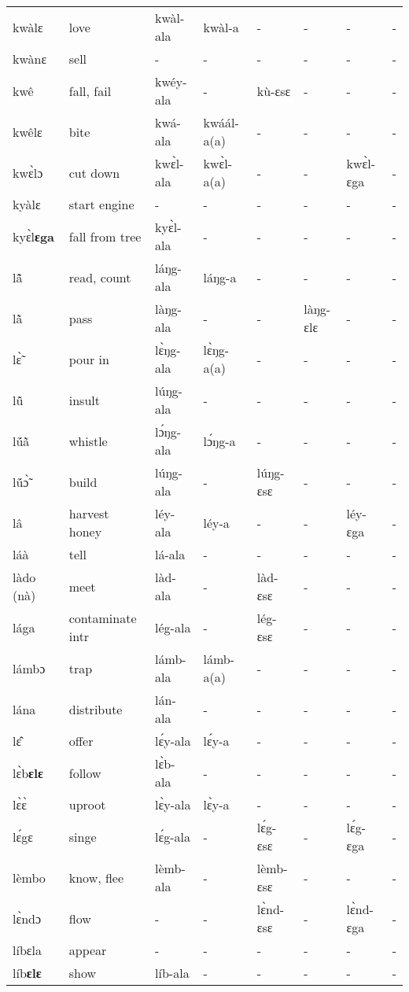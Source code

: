 \begin{sidewaystable}
\begin{longtable}{lp{3.5cm}llllll}
kwàlɛ & love & kwàl-ala & kwàl-a & - & - & - & - \\
kwànɛ & sell & - & - & - & - & - & - \\
kwê & fall, fail & kwéy-ala & - & kù-ɛsɛ & - & - & - \\
kwêlɛ & bite & kwá-ala & kwáál-a(a) & - & -  & - & - \\
 kwɛ̀lɔ & cut down & kwɛ̀l-ala & kwɛ̀l-a(a) & - & - & kwɛ̀l-ɛga & - \\
kyàlɛ & start engine & - & - & - & - & - & - \\
kyɛ̀l{\bfseries ɛga} & fall from tree & kyɛ̀l-ala & - & - & - & - & - \\
lã̂ & read, count & láŋg-ala & láŋg-a & - & - & - & - \\
lã̀ & pass & làŋg-ala & - & - &  làŋg-ɛlɛ  & - & - \\
lɛ̃̀ & pour in & lɛ̀ŋg-ala & lɛ̀ŋg-a(a)  & - & - & - & - \\
lũ̂ & insult & lúŋg-ala & - & - &  - & - & - \\
lṹã̀ & whistle & lɔ́ŋg-ala & lɔ́ŋg-a & - & - & - & - \\
lṹɔ̃̀ & build & lúŋg-ala & - & lúŋg-ɛsɛ & - & - & - \\
lâ & harvest honey & léy-ala & léy-a & - & - &  léy-ɛga & - \\
láà & tell & lá-ala & - & -  & - & - & - \\
làdo (nà) & meet & làd-ala & - & làd-ɛsɛ & - & - & - \\
lága & contaminate intr & lég-ala & - & lég-ɛsɛ & - & - & - \\
lámbɔ & trap & lámb-ala & lámb-a(a) & - & - & - & - \\
lána & distribute & lán-ala & - & - & - & - & - \\
lɛ̂ & offer & lɛ́y-ala & lɛ́y-a & - & - & - & - \\
lɛ̀b{\bfseries ɛlɛ} & follow & lɛ̀b-ala & - & - & - & - & - \\
lɛ̀ɛ̀ & uproot & lɛ̀y-ala & lɛ̀y-a & - & - & - & - \\
lɛ́gɛ & singe & lɛ́g-ala & - &  lɛ́g-ɛsɛ & - & lɛ́g-ɛga & - \\
lèmbo & know, flee & lèmb-ala & - & lèmb-ɛsɛ & - & - & - \\
lɛ̀ndɔ & flow & - & - & lɛ̀nd-ɛsɛ & - & lɛ̀nd-ɛga & - \\
líbɛla & appear & - & - & - & - & - & - \\
líb{\bfseries ɛlɛ} & show & líb-ala & - & - & - & - & - \\

\end{longtable}
\end{sidewaystable}
